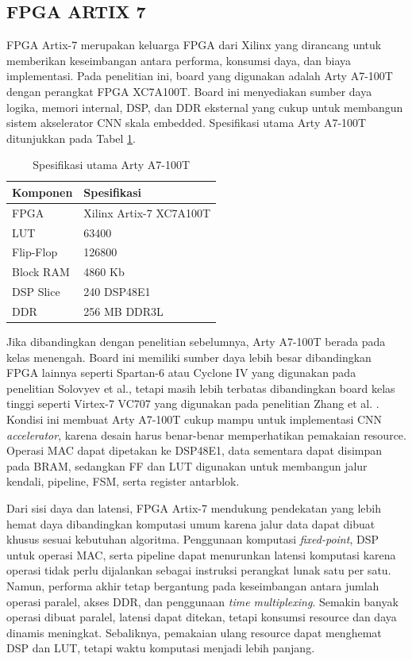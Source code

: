   \subsection{FPGA ARTIX 7}

  FPGA Artix-7 merupakan keluarga FPGA dari Xilinx yang dirancang untuk
  memberikan keseimbangan antara performa, konsumsi daya, dan biaya implementasi.
  Pada penelitian ini, board yang digunakan adalah Arty A7-100T dengan perangkat
  FPGA XC7A100T. Board ini menyediakan sumber daya logika, memori internal, DSP,
  dan DDR eksternal yang cukup untuk membangun sistem akselerator CNN skala
  embedded. Spesifikasi utama Arty A7-100T ditunjukkan pada Tabel
  \ref{tab:arty_a7_spec}.

  \begin{table}[H]
      \centering
      \caption{Spesifikasi utama Arty A7-100T}
      \label{tab:arty_a7_spec}
      \begin{tabular}{ll}
          \hline
          \textbf{Komponen} & \textbf{Spesifikasi} \\
          \hline
          FPGA & Xilinx Artix-7 XC7A100T \\
          LUT & 63400 \\
          Flip-Flop & 126800 \\
          Block RAM & 4860 Kb \\
          DSP Slice & 240 DSP48E1 \\
          DDR & 256 MB DDR3L \\
          \hline
      \end{tabular}
  \end{table}

  Jika dibandingkan dengan penelitian sebelumnya, Arty A7-100T berada pada kelas
  menengah. Board ini memiliki sumber daya lebih besar dibandingkan FPGA lainnya
  seperti Spartan-6 atau Cyclone IV yang digunakan pada penelitian Solovyev et al.,
  tetapi masih lebih terbatas dibandingkan board kelas tinggi seperti Virtex-7 VC707
  yang digunakan pada penelitian Zhang et al. \cite{Solovyev2019FixedPointCNN,Zhang2015OptimizingCNNFPGA}.
  Kondisi ini membuat Arty A7-100T cukup mampu untuk implementasi CNN
  \emph{accelerator}, karena desain harus benar-benar memperhatikan pemakaian
  resource. Operasi MAC dapat dipetakan ke DSP48E1, data sementara dapat disimpan
  pada BRAM, sedangkan FF dan LUT digunakan untuk membangun jalur kendali,
  pipeline, FSM, serta register antarblok.

  Dari sisi daya dan latensi, FPGA Artix-7 mendukung pendekatan yang lebih hemat
  daya dibandingkan komputasi umum karena jalur data dapat dibuat khusus sesuai
  kebutuhan algoritma. Penggunaan komputasi \emph{fixed-point}, DSP untuk operasi
  MAC, serta pipeline dapat menurunkan latensi komputasi karena operasi tidak perlu
  dijalankan sebagai instruksi perangkat lunak satu per satu. Namun, performa akhir
  tetap bergantung pada keseimbangan antara jumlah operasi paralel, akses DDR, dan
  penggunaan \emph{time multiplexing}. Semakin banyak operasi dibuat paralel, latensi
  dapat ditekan, tetapi konsumsi resource dan daya dinamis meningkat. Sebaliknya,
  pemakaian ulang resource dapat menghemat DSP dan LUT, tetapi waktu komputasi
  menjadi lebih panjang.

